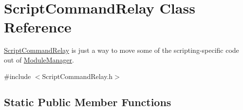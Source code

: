 \hypertarget{class_script_command_relay}{}\section{Script\+Command\+Relay Class Reference}
\label{class_script_command_relay}


\hyperlink{class_script_command_relay}{Script\+Command\+Relay} is just a way to move some of the scripting-\/specific code out of \hyperlink{class_module_manager}{Module\+Manager}.  




{\ttfamily \#include $<$Script\+Command\+Relay.\+h$>$}

\subsection*{Static Public Member Functions}
